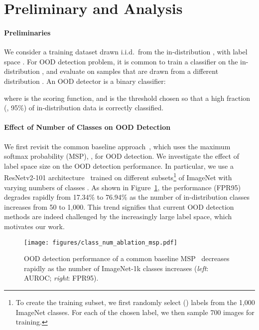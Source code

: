 \documentclass[final]{cvpr}
\begin{document}
\section{Preliminary and Analysis}
\vspace{-0.1cm}
\paragraph{Preliminaries} We consider a training dataset drawn i.i.d.\ from the in-distribution , with label space . For OOD detection problem, it is common to train a classifier  on the in-distribution , and evaluate on samples that are drawn from a different distribution . An OOD detector  is a binary classifier:
\vspace{-0.1cm}

where  is the scoring function, and  is the threshold chosen so that a high fraction (\eg, 95\%) of in-distribution data is correctly classified. 

\vspace{-0.3cm}
\paragraph{Effect of Number of Classes on OOD Detection} We first revisit the common baseline approach~\cite{hendrycks2016baseline}, which uses the maximum softmax probability (MSP), , for OOD detection. We investigate the effect of label space size on the OOD detection performance. In particular, we use a ResNetv2-101 architecture~\cite{he2016identity} trained on different subsets\footnote{To create the training subset, we first randomly select  () labels from the 1,000 ImageNet classes. For each of the chosen label, we then sample 700 images for training.} of ImageNet with varying numbers of classes . As shown in Figure~\ref{fig:class_num_ablation_baseline}, the performance (FPR95) degrades rapidly from 17.34\% to 76.94\% as the number of in-distribution classes increases from 50 to 1,000. 
This trend signifies that current OOD detection methods are indeed challenged by the
increasingly large label space, which motivates our work. 



\begin{figure}[h]
    \centering
    \texttt{[image: figures/class\_num\_ablation\_msp.pdf]}
    \caption{\small OOD detection performance of a common baseline MSP~\cite{hendrycks2016baseline} decreases rapidly as the number of ImageNet-1k classes increases (\emph{left}: AUROC; \emph{right}: FPR95).} \label{fig:class_num_ablation_baseline}
\end{figure}
\end{document}
